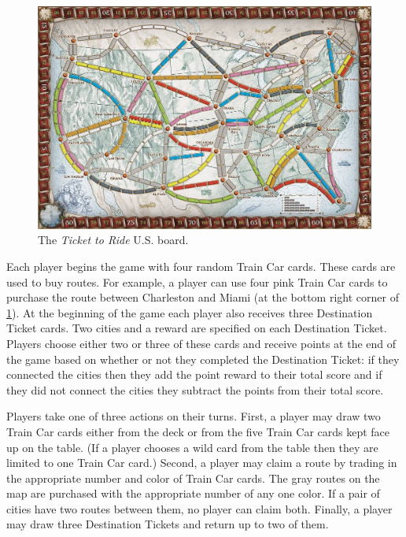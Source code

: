 \begin{figure}[ht]
\centering
\includegraphics[scale=.2]{figures/board}
\caption{The \textit{Ticket to Ride} U.S. board.}
\label{fig:board}
\end{figure}

Each player begins the game with four random Train Car cards.
These cards are used to buy routes.
For example, a player can use four pink Train Car cards to purchase
the route between Charleston and Miami
(at the bottom right corner of \cref{fig:board}).
At the beginning of the game 
each player also receives three Destination Ticket cards.
Two cities and a reward are specified on each Destination Ticket.
Players choose either two or three of these cards and
receive points at the end of the game based on whether
or not they completed the Destination Ticket:
if they connected the cities then they add the point reward to their
total score and
if they did not connect the cities they subtract the points from their
total score.

Players take one of three actions on their turns.
First, a player may draw two Train Car cards either
from the deck or from the five Train Car cards
kept face up on the table. 
(If a player chooses a wild card from the table
then they are limited to one Train Car card.)
Second, a player may claim a route by trading in
the appropriate number and color of Train Car cards.
The gray routes on the map are purchased with
the appropriate number of any one color.
If a pair of cities have two routes between them,
no player can claim both.
Finally, a player may draw three Destination Tickets
and return up to two of them.
